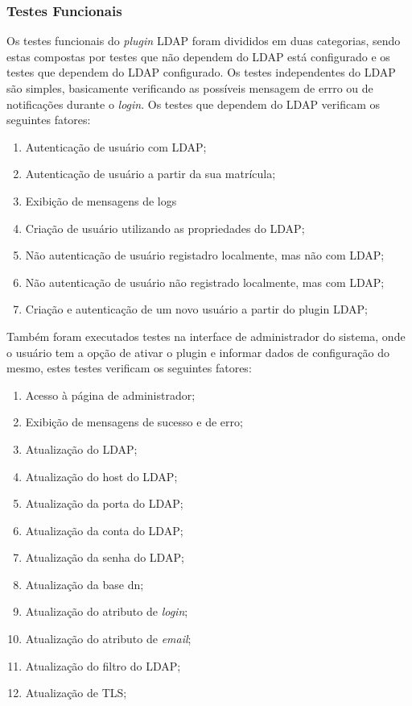 \subsubsection{Testes Funcionais}
%
Os testes funcionais do \textit{plugin} LDAP foram divididos em duas categorias, sendo estas compostas por testes que não dependem do LDAP está configurado e os testes que dependem do LDAP configurado. Os testes independentes do LDAP são simples, basicamente verificando as possíveis mensagem de errro ou de notificações durante o \textit{login}. Os testes  que dependem do LDAP verificam os seguintes fatores:
%
\begin{enumerate}
\item Autenticação de usuário com LDAP;
\item Autenticação de usuário a partir da sua matrícula;
\item Exibição de mensagens de logs
\item Criação de usuário utilizando as propriedades do LDAP;
\item Não autenticação de usuário registadro localmente, mas não com LDAP;
\item Não autenticação de usuário não registrado localmente, mas com LDAP;
\item Criação e autenticação de um novo usuário a partir do plugin LDAP;
\end{enumerate}
%
Também foram executados testes na interface de administrador do sistema, onde o usuário tem a opção de ativar o plugin e informar dados de configuração do mesmo, estes testes verificam os seguintes fatores:
%
\begin{enumerate}
\item Acesso à página de administrador;
\item Exibição de mensagens de sucesso e de erro;
\item Atualização do LDAP;
\item Atualização do host do LDAP;
\item Atualização da porta do LDAP;
\item Atualização da conta do LDAP;
\item Atualização da senha do LDAP;
\item Atualização da base dn;
\item Atualização do atributo de \textit{login};
\item Atualização do atributo de \textit{email};
\item Atualização do filtro do LDAP;
\item Atualização de TLS;
\end{enumerate}

